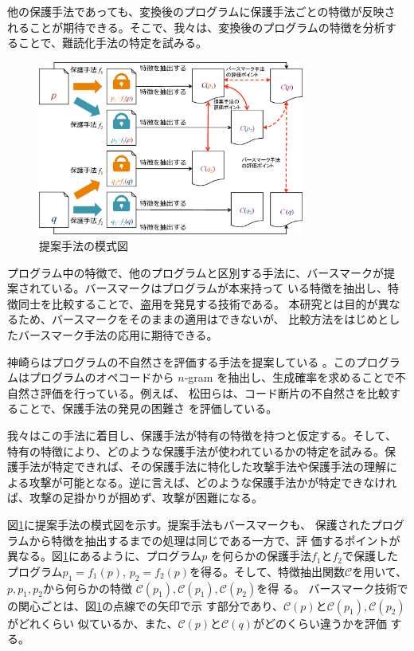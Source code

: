 \documentclass[12pt,twoside]{jreport}
\newcommand{\birth}[1]{\mathcal{C}(#1)}
\begin{document}
他の保護手法であっても、変換後のプログラムに保護手法ごとの特徴が反映さ
れることが期待できる。そこで、我々は、変換後のプログラムの特徴を分析す
ることで、難読化手法の特定を試みる。

\begin{figure}[b]
  \centering
  \includegraphics[width=0.78\textwidth]{images/key_idea}
  \caption{提案手法の模式図}\label{fig:keyidea}
\end{figure}

プログラム中の特徴で、他のプログラムと区別する手法に、バースマークが提
案されている\cite{tamada05ieice}。バースマークはプログラムが本来持って
いる特徴を抽出し、特徴同士を比較することで、盗用を発見する技術である。
本研究とは目的が異なるため、バースマークをそのままの適用はできないが、
比較方法をはじめとしたバースマーク手法の応用に期待できる。

神崎らはプログラムの不自然さを評価する手法を提案している
\cite{kanzaki14ipsj}。このプログラムはプログラムのオペコードから
$n$-gram を抽出し、生成確率を求めることで不自然さ評価を行っている。例えば、
松田らは、コード断片の不自然さを比較することで、保護手法の発見の困難さ
を評価している\cite{matsuda15ipsj}。


我々はこの手法に着目し、保護手法が特有の特徴を持つと仮定する。そして、
特有の特徴により、どのような保護手法が使われているかの特定を試みる。保
護手法が特定できれば、その保護手法に特化した攻撃手法や保護手法の理解に
よる攻撃が可能となる。逆に言えば、どのような保護手法かが特定できなけれ
ば、攻撃の足掛かりが掴めず、攻撃が困難になる。

図\ref{fig:keyidea}に提案手法の模式図を示す。提案手法もバースマークも、
保護されたプログラムから特徴を抽出するまでの処理は同じである一方で、評
価するポイントが異なる。図\ref{fig:keyidea}にあるように、プログラム$p$
を何らかの保護手法$f_1$と$f_2$で保護したプログラム$p_1=f_1(p)$,
$p_2=f_2(p)$を得る。そして、特徴抽出関数$\mathcal{C}$を用いて、$p,
p_1, p_2$から何らかの特徴 $\birth{p_1}, \birth{p_1}, \birth{p_2}$を得
る。
%
バースマーク技術での関心ごとは、図\ref{fig:keyidea}の点線での矢印で示
す部分であり、$\birth{p}$と$\birth{p_1}, \birth{p_2}$がどれくらい
似ているか、また、$\birth{p}$と$\birth{q}$がどのくらい違うかを評価
する。
\end{document}
